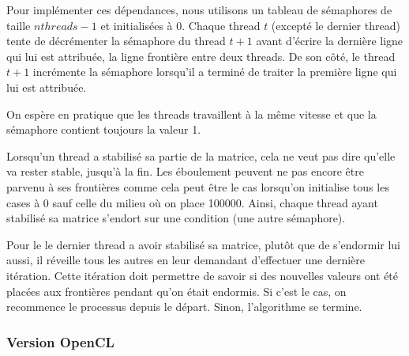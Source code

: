 Pour implémenter ces dépendances, nous utilisons un tableau de
sémaphores de taille $nthreads-1$ et initialisées à 0. Chaque thread
$t$ (excepté le dernier thread) tente de décrémenter la sémaphore du
thread $t+1$ avant d'écrire la dernière ligne qui lui est attribuée,
la ligne frontière entre deux threads. De son côté, le thread $t+1$
incrémente la sémaphore lorsqu'il a terminé de traiter la première
ligne qui lui est attribuée.

On espère en pratique que les threads travaillent à la même vitesse
et que la sémaphore contient toujours la valeur 1.

Lorsqu'un thread a stabilisé sa partie de la matrice, cela ne veut pas
dire qu'elle va rester stable, jusqu'à la fin. Les éboulement peuvent
ne pas encore être parvenu à ses frontières comme cela peut être le
cas lorsqu'on initialise tous les cases à 0 sauf celle du milieu où on
place 100000. Ainsi, chaque thread ayant stabilisé sa matrice s'endort sur
une condition (une autre sémaphore).

Pour le le dernier thread a avoir stabilisé sa matrice, plutôt que de
s'endormir lui aussi, il réveille tous les autres en leur demandant
d'effectuer une dernière itération. Cette itération doit permettre de
savoir si des nouvelles valeurs ont été placées aux frontières pendant
qu'on était endormis. Si c'est le cas, on recommence le processus
depuis le départ. Sinon, l'algorithme se termine.

\subsubsection{Version OpenCL}
